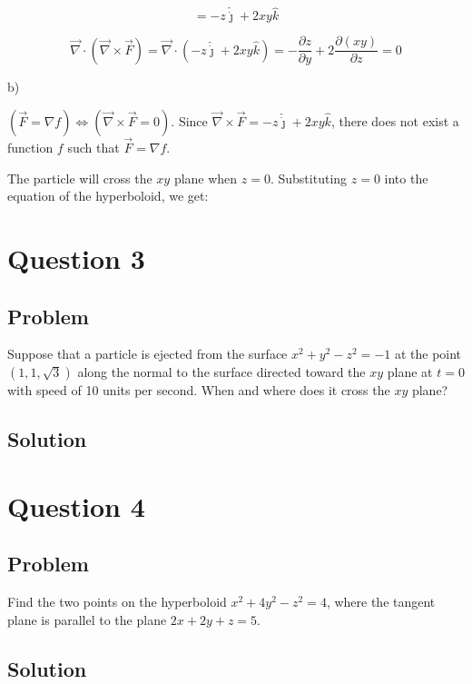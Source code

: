\documentclass[12pt]{article}
\begin{document}
\[
    = -z \hat{\dot{\jmath}}
    + 2 x y\hat{k}
\]

\[
    \vec{\nabla} \cdot(\vec{\nabla} \times \vec{F})
    = \vec{\nabla} \cdot(-z \hat{\dot{\jmath}} + 2 x y\hat{k})
    = - \frac{\partial z}{\partial y}  + 2 \frac{\partial \left(xy\right)}{\partial z}
    = 0
\]

b)

\((\vec{F}=\nabla f) \Longleftrightarrow  (\vec{\nabla} \times \vec{F} = 0)\). Since \(\vec{\nabla} \times \vec{F} = -z \hat{\dot{\jmath}} + 2 x y\hat{k}\), there does not exist a function \(f\) such that \(\vec{F}=\nabla f\).

The particle will cross the \(x y\) plane when \(z=0\). Substituting \(z=0\) into the equation of the hyperboloid, we get:

\newpage
\section{Question 3}

\subsection{Problem}

Suppose that a particle is ejected from the surface \(x^2+y^2-z^2=-1\) at the point
\((1,1, \sqrt{3})\) along the normal to the surface directed toward the \(x y\) plane at
\(t=0\) with speed of 10 units per second. When and where does it cross the \(x y\)
plane?

\subsection{Solution}



\newpage
\section{Question 4}

\subsection{Problem}

Find the two points on the hyperboloid \(x^2+4 y^2-z^2=4\),
where the tangent plane is parallel to the plane \(2 x+2 y+z=5\).

\subsection{Solution}



\newpage


\nocite{El-Deeb_PEU-218_Assignments}
\end{document}

